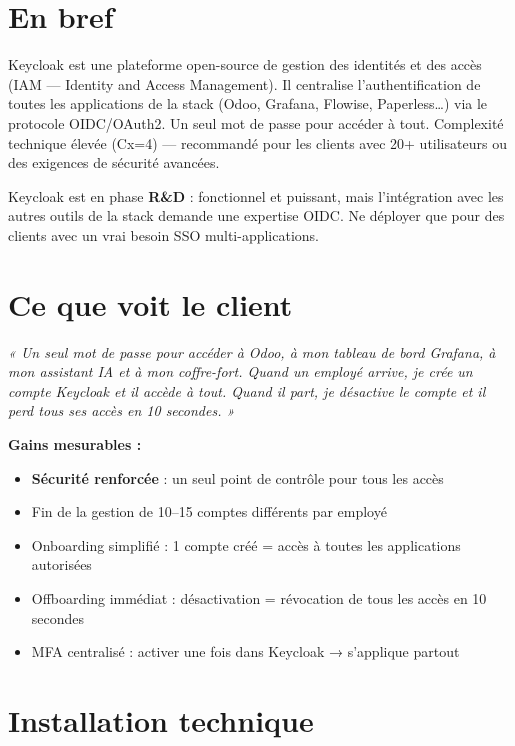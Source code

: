 \documentclass[11pt, a4paper]{article}
\begin{document}
\ficheHeader

\section*{En bref}
Keycloak est une plateforme open-source de gestion des identités et des accès (IAM — Identity and Access Management). Il centralise l'authentification de toutes les applications de la stack (Odoo, Grafana, Flowise, Paperless…) via le protocole OIDC/OAuth2. Un seul mot de passe pour accéder à tout. Complexité technique élevée (Cx=4) — recommandé pour les clients avec 20+ utilisateurs ou des exigences de sécurité avancées.

\begin{pointcle}
  Keycloak est en phase \textbf{R\&D} : fonctionnel et puissant, mais l'intégration avec les autres outils de la stack demande une expertise OIDC. Ne déployer que pour des clients avec un vrai besoin SSO multi-applications.
\end{pointcle}

\section{Ce que voit le client}

\begin{clientbox}
  \textit{« Un seul mot de passe pour accéder à Odoo, à mon tableau de bord Grafana, à mon assistant IA et à mon coffre-fort. Quand un employé arrive, je crée un compte Keycloak et il accède à tout. Quand il part, je désactive le compte et il perd tous ses accès en 10 secondes. »}
\end{clientbox}

\textbf{Gains mesurables :}
\begin{itemize}
  \item \textbf{Sécurité renforcée} : un seul point de contrôle pour tous les accès
  \item Fin de la gestion de 10–15 comptes différents par employé
  \item Onboarding simplifié : 1 compte créé = accès à toutes les applications autorisées
  \item Offboarding immédiat : désactivation = révocation de tous les accès en 10 secondes
  \item MFA centralisé : activer une fois dans Keycloak → s'applique partout
\end{itemize}

\section{Installation technique}
\end{document}
